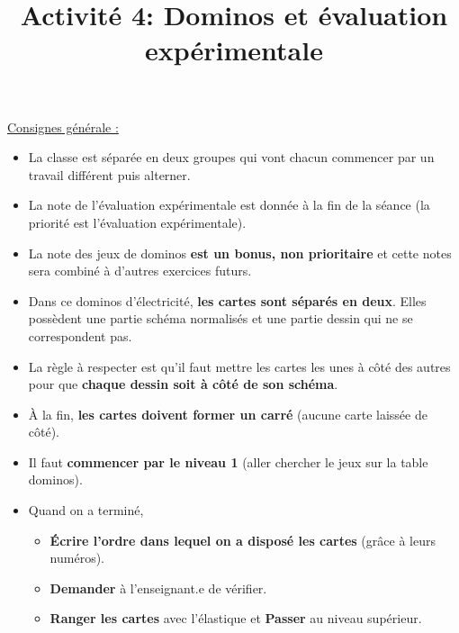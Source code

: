 \documentclass[10pt]{article}
\newcommand{\titreActivite}{\huge Activité 4: Dominos et évaluation expérimentale \vspace{-10pt}} %
\begin{document}
\date{}
\title{\titreActivite}
\maketitle %

\large \vspace{10pt}
\underline{Consignes générale :}
\begin{itemize}
	\item La classe est séparée en deux groupes qui vont chacun 
	commencer par un travail différent puis alterner.
	\item La note de l'évaluation expérimentale est donnée à la fin
	 de la séance (la priorité est l'évaluation expérimentale).
	\item La note des jeux de dominos \textbf{est un bonus, non prioritaire}  
	et cette notes sera combiné à d'autres exercices futurs.
\end{itemize}
\vspace{-20pt}
\vspace{-10pt}
	\begin{itemize}
		\item Dans ce dominos d'électricité, \textbf{les cartes sont séparés en deux}. 
		Elles possèdent une partie schéma normalisés  et une partie dessin qui ne se correspondent pas. 
		\item La règle à respecter est qu'il faut mettre les cartes les unes à 
		côté des autres pour que \textbf{chaque dessin soit à côté de son schéma}. 
		\item À la fin, \textbf{les cartes doivent former un carré} (aucune carte laissée de côté).
		\item Il faut \textbf{commencer par le niveau 1} (aller chercher le jeux sur la table dominos).
		\item Quand on a terminé, 
		\begin{itemize}
			\item \textbf{Écrire l'ordre dans lequel on a disposé les cartes} (grâce à leurs numéros).
			\item \textbf{Demander} à l'enseignant.e de vérifier.
			\item \textbf{Ranger les cartes} avec l'élastique et \textbf{Passer} au niveau supérieur.  
		\end{itemize}	
		  
	\end{itemize}
\end{document}

